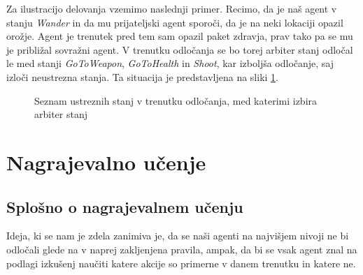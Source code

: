 \documentclass[a4paper,10pt]{article}
\begin{document}
Za ilustracijo delovanja vzemimo naslednji primer. Recimo, da je naš agent v stanju \textit{Wander} in da mu prijateljski agent sporoči, da je na neki lokaciji opazil orožje. Agent je trenutek pred tem sam opazil paket zdravja, prav tako pa se mu je približal sovražni agent. V trenutku odločanja se bo torej arbiter stanj odločal le med stanji \textit{GoToWeapon}, \textit{GoToHealth} in \textit{Shoot}, kar izboljša odločanje, saj izloči neustrezna stanja. Ta situacija je predstavljena na sliki \ref{fig:eligible-set-example}. 

\begin{figure}
  \centering
  \caption{Seznam ustreznih stanj v trenutku odločanja, med katerimi izbira arbiter stanj}
  \label{fig:eligible-set-example}
\end{figure}

\section{Nagrajevalno učenje} \label{sec:nagrajevalno-ucenje}
\subsection{Splošno o nagrajevalnem učenju}
Ideja, ki se nam je zdela zanimiva je, da se naši agenti na najvišjem nivoji ne bi odločali glede na v naprej zakljenjena pravila, ampak, da bi se vsak agent znal
na podlagi izkušenj naučiti katere akcije so primerne v danem trenutku in katere ne. 
\end{document}

